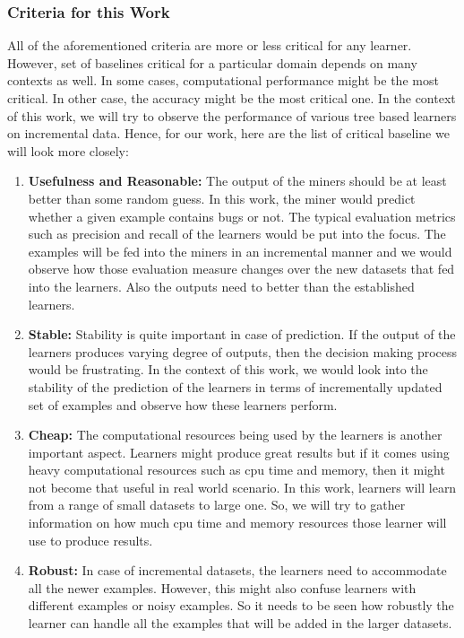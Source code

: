 \documentclass[sigplan]{acmart}\settopmatter{printfolios=true,printccs=false,printacmref=false}
\begin{document}
\subsubsection{Criteria for this Work}
All of the aforementioned criteria are more or less critical for any learner. However, set of baselines critical for a particular domain depends on many contexts as well. In some cases, computational performance might be the most critical. In other case, the accuracy might be the most critical one. In the context of this work, we will try to observe the performance of various tree based learners on incremental data. Hence, for our work, here are the list of critical baseline we will look more closely:
\begin{enumerate}
	\item \textbf{Usefulness and Reasonable: } The output of the miners should be at least better than some random guess. In this work, the miner would predict whether a given example contains bugs or not. The typical evaluation metrics such as precision and recall of the learners would be put into the focus. The examples will be fed into the miners in an incremental manner and we would observe how those evaluation measure changes over the new datasets that fed into the learners. Also the outputs need to better than the established learners.
	\item \textbf{Stable: } Stability is quite important in case of prediction. If the output of the learners produces varying degree of outputs, then the decision making process would be frustrating. In the context of this work, we would look into the stability of the prediction of the learners in terms of incrementally updated set of examples and observe how these learners perform.
	\item \textbf{Cheap: } The computational resources being used by the learners is another important aspect. Learners might produce great results but if it comes using heavy computational resources such as cpu time and memory, then it might not become that useful in real world scenario. In this work, learners will learn from a range of small datasets to large one. So, we will try to gather information on how much cpu time and memory resources those learner will use to produce results.
	\item \textbf{Robust: } In case of incremental datasets, the learners need to accommodate all the newer examples. However, this might also confuse learners with different examples or noisy examples. So it needs to be seen how robustly the learner can handle all the examples that will be added in the larger datasets.

\end{enumerate}
\end{document}
